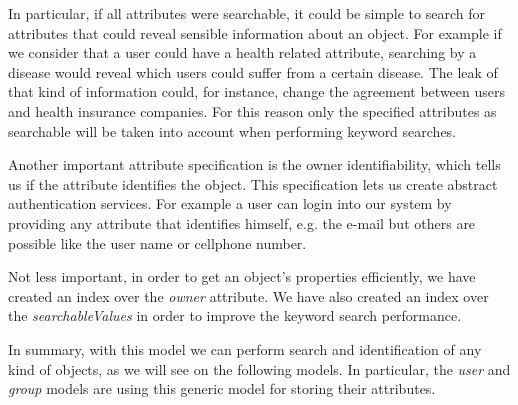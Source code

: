 In particular, if all attributes were searchable, it could be simple to search for attributes that could reveal sensible information about an object. For example if we consider that a user could have a health related attribute, searching by a disease would reveal which users could suffer from a certain disease. The leak of that kind of information could, for instance, change the agreement between users and health insurance companies. For this reason only the specified attributes as searchable will be taken into account when performing keyword searches.

Another important attribute specification is the owner identifiability, which tells us if the attribute identifies the object. This specification lets us create abstract authentication services. For example a user can login into our system by providing any attribute that identifies himself, e.g. the e-mail but others are possible like the user name or cellphone number. 

Not less important, in order to get an object's properties efficiently, we have created an index over the \emph{owner} attribute. We have also created an index over the \emph{searchableValues} in order to improve the keyword search performance.

In summary, with this model we can perform search and identification of any kind of objects, as we will see on the following models. In particular, the \emph{user} and \emph{group} models are using this generic model for storing their attributes. 



